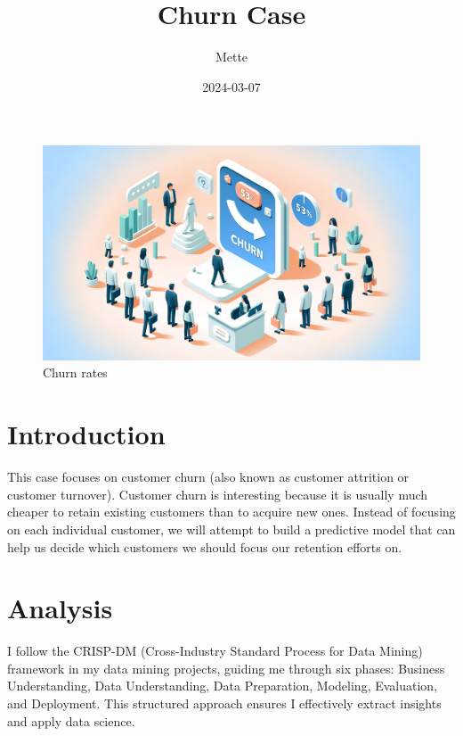 \documentclass[
  letterpaper,
  DIV=11,
  numbers=noendperiod]{scrartcl}
\title{Churn Case}
\author{Mette}
\date{2024-03-07}
\renewcommand*\contentsname{Table of contents}
\newcommand\contentsname{Table of contents}
\begin{document}
\maketitle

\renewcommand*\contentsname{Table of contents}
{
\hypersetup{linkcolor=}
\setcounter{tocdepth}{3}
\tableofcontents
}
\begin{figure}[H]

{\centering \includegraphics{churnbillede.jpg}

}

\caption{Churn rates}

\end{figure}%

\section{Introduction}\label{introduction}

This case focuses on customer churn (also known as customer attrition or
customer turnover). Customer churn is interesting because it is usually
much cheaper to retain existing customers than to acquire new ones.
Instead of focusing on each individual customer, we will attempt to
build a predictive model that can help us decide which customers we
should focus our retention efforts on.

\section{Analysis}\label{analysis}

I follow the CRISP-DM (Cross-Industry Standard Process for Data Mining)
framework in my data mining projects, guiding me through six phases:
Business Understanding, Data Understanding, Data Preparation, Modeling,
Evaluation, and Deployment. This structured approach ensures I
effectively extract insights and apply data science.
\end{document}
